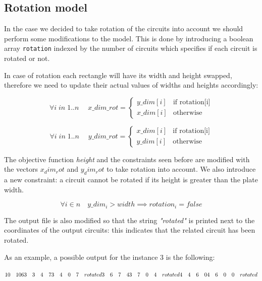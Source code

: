 \subsection{Rotation model}

In the case we decided to take rotation of the circuits into account we should perform some modifications to the model. This is done by introducing a boolean array \verb|rotation| indexed by the number of circuits which specifies if each circuit is rotated or not.

In case of rotation each rectangle will have its width and height swapped, therefore we need to update their actual values of widths and heights accordingly:

\begin{equation*}
\forall i \; in \; {1..n} \quad \; x\_dim\_rot  = \begin{cases} y\_dim[i] & \mbox{if } \mbox{rotation[i]} \\ x\_dim[i] & \mbox{otherwise}\end{cases}
\end{equation*}

\begin{equation*}
\forall i \; in \; {1..n} \quad \; y\_dim\_rot  = \begin{cases} x\_dim[i] & \mbox{if } \mbox{rotation[i]} \\ y\_dim[i] & \mbox{otherwise}\end{cases}
\end{equation*}

The objective function \textit{height} and the constraints seen before are modified with the vectors $x_dim_rot$ and $y_dim_rot$ to take rotation into account. We also introduce a new constraint: a circuit cannot be rotated if its height is greater than the plate width.

\begin{equation*}
    \forall i \in n \quad y\_dim_i > width \implies rotation_i = false
\end{equation*}

The output file is also modified so that the string \textit{"rotated"} is printed next to the coordinates of the output circuits: this indicates that the related circuit has been rotated. 

As an example, a possible output for the instance 3 is the following:

$ 10 \quad 10 \\
6 \\
3 \quad 3 \quad 4 \quad 7 \\
3 \quad 4 \quad 0 \quad 7 \quad rotated \\
3 \quad 6 \quad 7 \quad 4 \\
3 \quad 7 \quad 0 \quad 4 \quad rotated \\
4 \quad 4 \quad 6 \quad 0 \\
4 \quad 6 \quad 0 \quad 0 \quad rotated $ 

